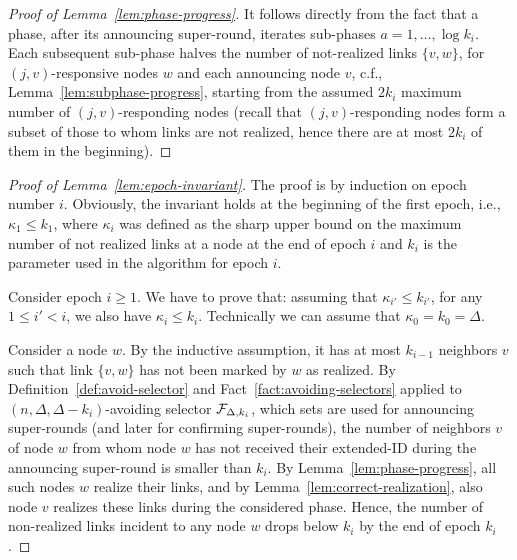 \begin{proof}[Proof of Lemma~\ref{lem:phase-progress}]
It follows directly from the fact that a phase, after its announcing super-round, iterates sub-phases $a=1,\ldots,\log k_i$. Each subsequent sub-phase halves the number of not-realized links $\{v,w\}$, for $(j,v)$-responsive nodes $w$ and each announcing node $v$, c.f., Lemma~\ref{lem:subphase-progress}, starting from the assumed $2k_i$ maximum number of $(j,v)$-responding nodes (recall that $(j,v)$-responding nodes form a subset of those to whom links are not realized, hence there are at most $2k_i$ of them in the beginning).
\end{proof}


\begin{proof}[Proof of Lemma~\ref{lem:epoch-invariant}]
The proof is by induction on epoch number $i$.
Obviously, the invariant holds at the beginning of the first epoch, i.e., $\kappa_1\le k_1$, where $\kappa_i$ was defined as the sharp upper bound on the maximum number of not realized links at a node at the end of epoch $i$ and $k_i$ is the parameter used in the algorithm for epoch $i$. 

Consider epoch $i\ge 1$.
We have to prove that:
assuming that $\kappa_{i'}\le k_{i'}$, for any $1\le i' < i$, we also have $\kappa_i \le k_i$.
Technically we can assume that $\kappa_0=k_0=\Delta$.

Consider a node $w$. 
By the inductive assumption, it has at most $k_{i-1}$ neighbors $v$ such that link $\{v,w\}$ has not been marked by $w$ as realized.
By Definition~\ref{def:avoid-selector} and Fact~\ref{fact:avoiding-selectors} applied to $(n,\Delta,\Delta-k_i)$-avoiding selector $\mathcal{F}_{\Delta,k_i}$, 
which sets are used for announcing super-rounds (and later for confirming super-rounds), the number of neighbors $v$ of node $w$ from whom node $w$ has not received their extended-ID during the announcing super-round is smaller than $k_i$. By Lemma~\ref{lem:phase-progress}, all such nodes $w$ realize their links, and by Lemma~\ref{lem:correct-realization}, also node $v$ realizes these links during the considered phase. Hence, the number of non-realized links incident to any node $w$ drops below $k_i$ by the end of epoch $k_i$.
\end{proof}


